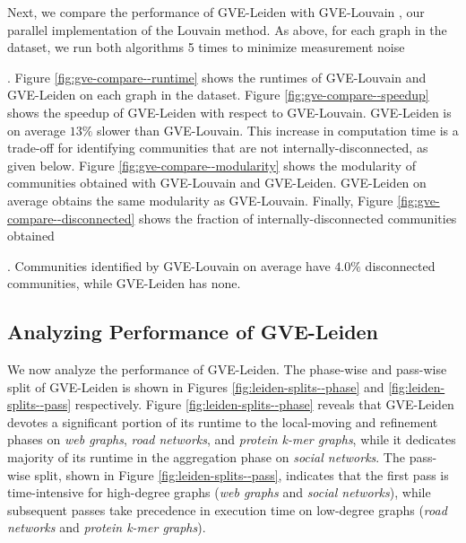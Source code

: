 
Next, we compare the performance of GVE-Leiden with GVE-Louvain \cite{sahu2023gvelouvain}, our parallel implementation of the Louvain method. As above, for each graph in the dataset, we run both algorithms 5 times to minimize measurement noise. Figure \ref{fig:gve-compare--runtime} shows the runtimes of GVE-Louvain and GVE-Leiden on each graph in the dataset. Figure \ref{fig:gve-compare--speedup} shows the speedup of GVE-Leiden with respect to GVE-Louvain. GVE-Leiden is on average $13\%$ slower than GVE-Louvain. This increase in computation time is a trade-off for identifying communities that are not internally-disconnected, as given below. Figure \ref{fig:gve-compare--modularity} shows the modularity of communities obtained with GVE-Louvain and GVE-Leiden. GVE-Leiden on average obtains the same modularity as GVE-Louvain. Finally, Figure \ref{fig:gve-compare--disconnected} shows the fraction of internally-disconnected communities obtained. Communities identified by GVE-Louvain on average have $4.0\%$ disconnected communities, while GVE-Leiden has none.








\subsection{Analyzing Performance of GVE-Leiden}

We now analyze the performance of GVE-Leiden. The phase-wise and pass-wise split of GVE-Leiden is shown in Figures \ref{fig:leiden-splits--phase} and \ref{fig:leiden-splits--pass} respectively. Figure \ref{fig:leiden-splits--phase} reveals that GVE-Leiden devotes a significant portion of its runtime to the local-moving and refinement phases on \textit{web graphs}, \textit{road networks}, and \textit{protein k-mer graphs}, while it dedicates majority of its runtime in the aggregation phase on \textit{social networks}. The pass-wise split, shown in Figure \ref{fig:leiden-splits--pass}, indicates that the first pass is time-intensive for high-degree graphs (\textit{web graphs} and \textit{social networks}), while subsequent passes take precedence in execution time on low-degree graphs (\textit{road networks} and \textit{protein k-mer graphs}).

